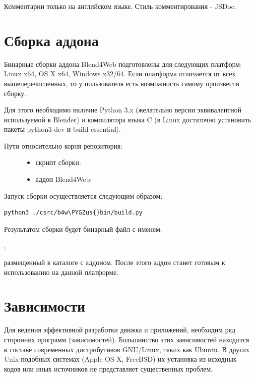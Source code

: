 \documentclass[a4paper,12pt,oneside]{sphinxmanual}
\def\PYGZus{\char`\_}
\begin{document}
Комментарии только на английском языке. Стиль комментирования - JSDoc.


\section{Сборка аддона}
\label{developers_advanced:id4}
Бинарные сборки аддона Blend4Web подготовлены для следующих платформ: Linux x64, OS X x64, Windows x32/64.
Если платформа отличается от всех вышеперечисленных, то у пользователя есть возможность самому произвести сборку.

Для этого необходимо наличие Python 3.x (желательно версии эквивалентной используемой в Blender) и компилятора языка C (в Linux достаточно установить пакеты python3-dev и build-essential).
\begin{description}
\item[{Пути относительно корня репозитория:}] \leavevmode\begin{itemize}
\item {} 
скрипт сборки: 

\item {} 
аддон Blend4Web: 

\end{itemize}

\end{description}

Запуск сборки осуществляется следующим образом:

\begin{Verbatim}[commandchars=\\\{\}]
python3 ./csrc/b4w\PYGZus{}bin/build.py
\end{Verbatim}

Результатом сборки будет бинарный файл с именем:

,

размещенный в каталоге с аддоном. После этого аддон станет готовым к использованию на данной платформе.


\section{Зависимости}
\label{developers_advanced:dependencies}\label{developers_advanced:id5}
Для ведения эффективной разработки движка и приложений, необходим ряд сторонних
программ (зависимостей). Большинство этих зависимостей находится в составе
современных дистрибутивов GNU/Linux, таких как Ubuntu. В других Unix-подобных
системах (Apple OS X, FreeBSD) их установка из исходных кодов или иных
источников не представляет существенных проблем.
\end{document}

